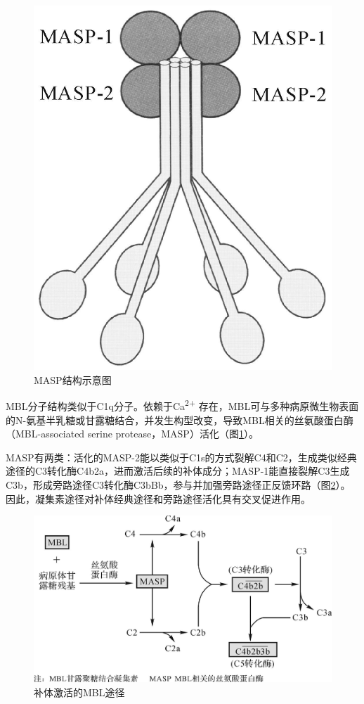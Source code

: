 \begin{figure}[!htbp]
\begin{minipage}[b]{0.45\textwidth}
    \includegraphics[height=.2\textheight]{./images/Image00084.jpg}
 \captionsetup{justification=centering}
 \caption{MASP结构示意图}
 \label{fig5-6}
\end{minipage}
\end{figure} 


MBL分子结构类似于C1q分子。依赖于Ca\textsuperscript{2+}
存在，MBL可与多种病原微生物表面的N-氨基半乳糖或甘露糖结合，并发生构型改变，导致MBL相关的丝氨酸蛋白酶（MBL-associated
serine protease，MASP）活化（图\ref{fig5-6}）。

MASP有两类：活化的MASP-2能以类似于C1s的方式裂解C4和C2，生成类似经典途径的C3转化酶C4b2a，进而激活后续的补体成分；MASP-1能直接裂解C3生成C3b，形成旁路途径C3转化酶C3bBb，参与并加强旁路途径正反馈环路（图\ref{fig5-7}）。因此，凝集素途径对补体经典途径和旁路途径活化具有交叉促进作用。

\begin{figure}[!htbp]
 \centering
 \includegraphics[width=.6\textwidth]{./images/Image00085.jpg}
 \captionsetup{justification=centering}
 \caption{补体激活的MBL途径}
 \label{fig5-7}
  \end{figure} 


